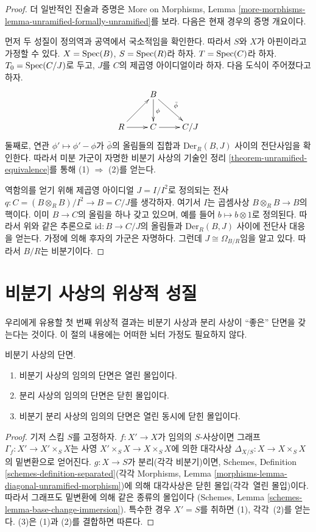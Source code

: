 \begin{proof}
더 일반적인 진술과 증명은 More on Morphisms, Lemma
\ref{more-morphisms-lemma-unramified-formally-unramified}를 보라.
다음은 현재 경우의 증명 개요이다.

\medskip\noindent
먼저 두 성질이 정의역과 공역에서 국소적임을 확인한다.
따라서 $S$와 $X$가 아핀이라고 가정할 수 있다.
$X = \mathop{\mathrm{Spec}}(B)$, $S = \mathop{\mathrm{Spec}}(R)$라 하자.
$T = \mathop{\mathrm{Spec}}(C)$라 하자. $T_0 = \mathop{\mathrm{Spec}}(C/J)$로 두고,
$J$를 $C$의 제곱영 아이디얼이라 하자. 다음 도식이 주어졌다고 하자.
$$
\xymatrix{
& B \ar[d]^\phi \ar[rd]^{\bar{\phi}}
& \\
R \ar[r] \ar[ur] & C \ar[r]
& C/J
}
$$
둘째로, 연관
$\phi' \mapsto \phi' - \phi$가 $\bar{\phi}$의 올림들의 집합과
$\text{Der}_R(B, J)$ 사이의 전단사임을 확인한다.
따라서 미분 가군이 자명한 비분기 사상의 기술인 정리
\ref{theorem-unramified-equivalence}를 통해 (1) $\Rightarrow$ (2)를 얻는다.

\medskip\noindent
역함의를 얻기 위해 제곱영 아이디얼
$J = I/I^2$로 정의되는 전사
$q : C = (B \otimes_R B)/I^2 \to B = C/J$를 생각하자.
여기서 $I$는 곱셈사상 $B \otimes_R B \to B$의 핵이다.
이미 $B \to C$의 올림을 하나 갖고 있으며, 예를 들어
$b \mapsto b \otimes 1$로 정의된다. 따라서 위와 같은 추론으로
$\text{id} : B \to C/J$의 올림들과 $\text{Der}_R(B, J)$ 사이에
전단사 대응을 얻는다. 가정에 의해 후자의 가군은 자명하다.
그런데 $J \cong \Omega_{B/R}$임을 알고 있다. 따라서 $B/R$는 비분기이다.
\end{proof}
\section{비분기 사상의 위상적 성질}
\label{section-topological-unramified}

\noindent
우리에게 유용할 첫 번째 위상적 결과는 비분기 사상과 분리 사상이
“좋은” 단면을 갖는다는 것이다.
이 절의 내용에는 어떠한 뇌터 가정도 필요하지 않다.

\begin{proposition}
\label{proposition-properties-sections}
비분기 사상의 단면.
\begin{enumerate}
\item 비분기 사상의 임의의 단면은 열린 몰입이다.
\item 분리 사상의 임의의 단면은 닫힌 몰입이다.
\item 비분기 분리 사상의 임의의 단면은 열린 동시에 닫힌 몰입이다.
\end{enumerate}
\end{proposition}

\begin{proof}
기저 스킴 $S$를 고정하자.
$f : X' \to X$가 임의의 $S$-사상이면 그래프
$\Gamma_f : X' \to X' \times_S X$는 사영
$X' \times_S X \to X \times_S X$에 의한 대각사상
$\Delta_{X/S} : X \to X \times_S X$의 밑변환으로 얻어진다.
$g : X \to S$가 분리(각각 비분기)이면, Schemes, Definition
\ref{schemes-definition-separated}(각각 Morphisms, Lemma
\ref{morphisms-lemma-diagonal-unramified-morphism})에 의해 대각사상은
닫힌 몰입(각각\ 열린 몰입)이다.
따라서 그래프도 밑변환에 의해 같은 종류의 몰입이다
(Schemes, Lemma \ref{schemes-lemma-base-change-immersion}).
특수한 경우 $X' = S$를 취하면 (1), 각각\ (2)를 얻는다.
(3)은 (1)과 (2)를 결합하면 따른다.
\end{proof}


